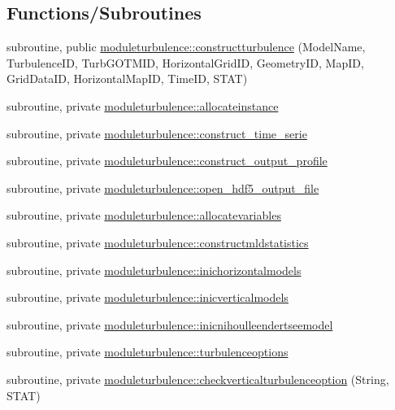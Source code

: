 \subsection*{Functions/\+Subroutines}
\begin{DoxyCompactItemize}
\item 
subroutine, public \mbox{\hyperlink{namespacemoduleturbulence_ace39b4cf089aa70cd60b083a3e341bc9}{moduleturbulence\+::constructturbulence}} (Model\+Name, Turbulence\+ID, Turb\+G\+O\+T\+M\+ID, Horizontal\+Grid\+ID, Geometry\+ID, Map\+ID, Grid\+Data\+ID, Horizontal\+Map\+ID, Time\+ID, S\+T\+AT)
\item 
subroutine, private \mbox{\hyperlink{namespacemoduleturbulence_a90657496e68df9748a112f2c597aeda7}{moduleturbulence\+::allocateinstance}}
\item 
subroutine, private \mbox{\hyperlink{namespacemoduleturbulence_abb6ebc59b95b0d9ec2ec468d7ab4b43a}{moduleturbulence\+::construct\+\_\+time\+\_\+serie}}
\item 
subroutine, private \mbox{\hyperlink{namespacemoduleturbulence_a4e5f190dd7da54cb916c8956e331e54c}{moduleturbulence\+::construct\+\_\+output\+\_\+profile}}
\item 
subroutine, private \mbox{\hyperlink{namespacemoduleturbulence_afa8dd99716d657032435779e03fff106}{moduleturbulence\+::open\+\_\+hdf5\+\_\+output\+\_\+file}}
\item 
subroutine, private \mbox{\hyperlink{namespacemoduleturbulence_aed366fd3ef93f5aff7c411412fbeb93a}{moduleturbulence\+::allocatevariables}}
\item 
subroutine, private \mbox{\hyperlink{namespacemoduleturbulence_a5e493c3242c2ad7a0f5df2178a37aa3b}{moduleturbulence\+::constructmldstatistics}}
\item 
subroutine, private \mbox{\hyperlink{namespacemoduleturbulence_a7d9753f3c1a5db2dfb55d80111926a99}{moduleturbulence\+::inichorizontalmodels}}
\item 
subroutine, private \mbox{\hyperlink{namespacemoduleturbulence_a676ecd9b2dc8e4fd2506801b206e0fdc}{moduleturbulence\+::inicverticalmodels}}
\item 
subroutine, private \mbox{\hyperlink{namespacemoduleturbulence_a59fa0936c4e079b4094b7b50f09a8092}{moduleturbulence\+::inicnihoulleendertseemodel}}
\item 
subroutine, private \mbox{\hyperlink{namespacemoduleturbulence_ad051a97467f11a69e59b2a477e516ba9}{moduleturbulence\+::turbulenceoptions}}
\item 
subroutine, private \mbox{\hyperlink{namespacemoduleturbulence_ad670a65f522fc5db35f455468f147913}{moduleturbulence\+::checkverticalturbulenceoption}} (String, S\+T\+AT)

\end{DoxyCompactItemize}
